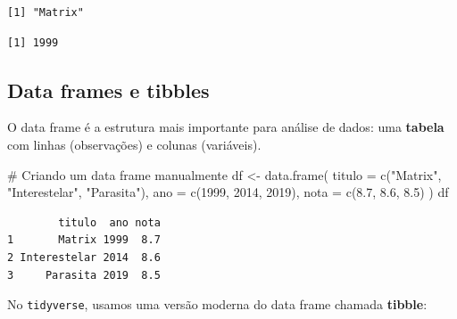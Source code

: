 \documentclass[
  letterpaper,
]{scrbook}
\newenvironment{Shaded}{\begin{snugshade}}{\end{snugshade}}
\newcommand{\AttributeTok}[1]{\textcolor[rgb]{0.40,0.45,0.13}{#1}}
\newcommand{\CommentTok}[1]{\textcolor[rgb]{0.37,0.37,0.37}{#1}}
\newcommand{\DecValTok}[1]{\textcolor[rgb]{0.68,0.00,0.00}{#1}}
\newcommand{\FloatTok}[1]{\textcolor[rgb]{0.68,0.00,0.00}{#1}}
\newcommand{\FunctionTok}[1]{\textcolor[rgb]{0.28,0.35,0.67}{#1}}
\newcommand{\NormalTok}[1]{\textcolor[rgb]{0.00,0.23,0.31}{#1}}
\newcommand{\OtherTok}[1]{\textcolor[rgb]{0.00,0.23,0.31}{#1}}
\newcommand{\SpecialCharTok}[1]{\textcolor[rgb]{0.37,0.37,0.37}{#1}}
\newcommand{\StringTok}[1]{\textcolor[rgb]{0.13,0.47,0.30}{#1}}
\begin{document}
\begin{Shaded}
\end{Shaded}

\begin{verbatim}
[1] "Matrix"
\end{verbatim}

\begin{Shaded}
\end{Shaded}

\begin{verbatim}
[1] 1999
\end{verbatim}

\subsection{Data frames e tibbles}\label{data-frames-e-tibbles}

O data frame é a estrutura mais importante para análise de dados: uma
\textbf{tabela} com linhas (observações) e colunas (variáveis).

\begin{Shaded}
\begin{Highlighting}[]
\CommentTok{\# Criando um data frame manualmente}
\NormalTok{df }\OtherTok{\textless{}{-}} \FunctionTok{data.frame}\NormalTok{(}
  \AttributeTok{titulo =} \FunctionTok{c}\NormalTok{(}\StringTok{"Matrix"}\NormalTok{, }\StringTok{"Interestelar"}\NormalTok{, }\StringTok{"Parasita"}\NormalTok{),}
  \AttributeTok{ano =} \FunctionTok{c}\NormalTok{(}\DecValTok{1999}\NormalTok{, }\DecValTok{2014}\NormalTok{, }\DecValTok{2019}\NormalTok{),}
  \AttributeTok{nota =} \FunctionTok{c}\NormalTok{(}\FloatTok{8.7}\NormalTok{, }\FloatTok{8.6}\NormalTok{, }\FloatTok{8.5}\NormalTok{)}
\NormalTok{)}
\NormalTok{df}
\end{Highlighting}
\end{Shaded}

\begin{verbatim}
        titulo  ano nota
1       Matrix 1999  8.7
2 Interestelar 2014  8.6
3     Parasita 2019  8.5
\end{verbatim}

No \texttt{tidyverse}, usamos uma versão moderna do data frame chamada
\textbf{tibble}:
\end{document}
